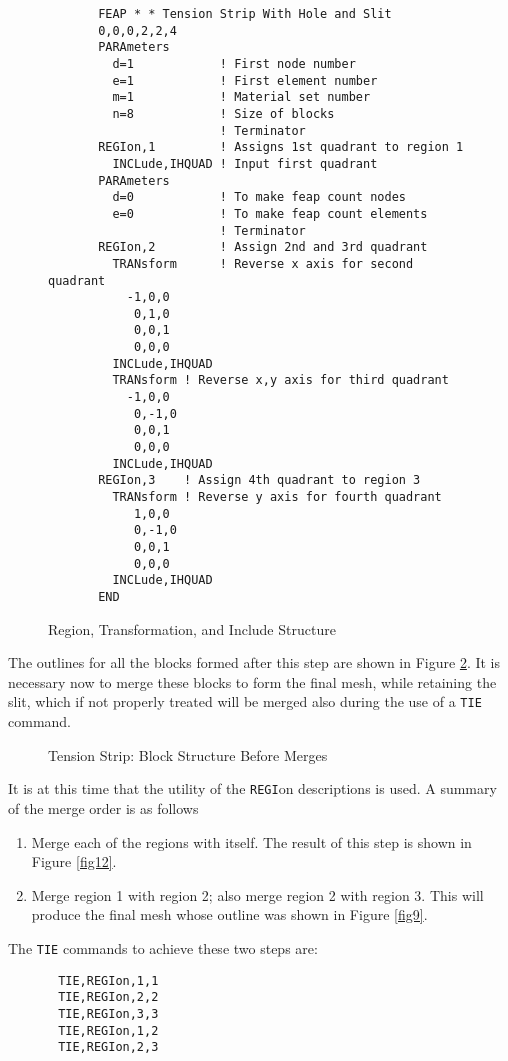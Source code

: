 \begin{figure}
\begin{verbatim}
       FEAP * * Tension Strip With Hole and Slit
       0,0,0,2,2,4
       PARAmeters
         d=1            ! First node number
         e=1            ! First element number
         m=1            ! Material set number
         n=8            ! Size of blocks
                        ! Terminator
       REGIon,1         ! Assigns 1st quadrant to region 1
         INCLude,IHQUAD ! Input first quadrant
       PARAmeters
         d=0            ! To make feap count nodes
         e=0            ! To make feap count elements
                        ! Terminator
       REGIon,2         ! Assign 2nd and 3rd quadrant
         TRANsform      ! Reverse x axis for second quadrant
           -1,0,0
            0,1,0
            0,0,1
            0,0,0
         INCLude,IHQUAD
         TRANsform ! Reverse x,y axis for third quadrant
           -1,0,0
            0,-1,0
            0,0,1
            0,0,0
         INCLude,IHQUAD
       REGIon,3    ! Assign 4th quadrant to region 3
         TRANsform ! Reverse y axis for fourth quadrant
            1,0,0
            0,-1,0
            0,0,1
            0,0,0
         INCLude,IHQUAD
       END
\end{verbatim}
\caption{Region, Transformation, and Include Structure}
\label{fig10}
\end{figure}

The outlines for all the blocks formed after this step are shown in
Figure \ref{fig11}.  It is necessary now to merge these blocks to form the
final mesh, while retaining the slit, which if not properly treated
will be merged also during the use of a {\tt TIE} command.

\begin{figure}[ht!]
\epsfxsize=1.6in
\centerline {\hfil {} \hfil}
\caption{Tension Strip: Block Structure Before Merges}
\label{fig11}
\end{figure}

It is at this time that the utility of the {\tt REGI}on descriptions is
used.  A summary of the merge order is as follows

\begin{enumerate}
\item
Merge each of the regions with itself.  The result of this step is shown
in Figure \ref{fig12}.
\item
Merge region 1 with region 2; also merge region 2 with region 3.
This will produce the final mesh whose outline was shown in Figure \ref{fig9}.
\end{enumerate}
The {\tt TIE} commands to achieve these two steps are:
\begin{verbatim}
       TIE,REGIon,1,1
       TIE,REGIon,2,2
       TIE,REGIon,3,3
       TIE,REGIon,1,2
       TIE,REGIon,2,3
\end{verbatim}


